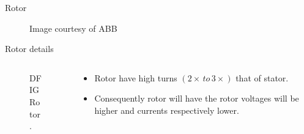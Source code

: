 \documentclass{beamer}
\begin{document}
\begin{frame}{Rotor}

    \begin{figure}
        \centering
        \caption{Image courtesy of ABB}
    \end{figure}    
\end{frame}


\begin{frame}{Rotor details}
  
  \begin{columns}
  
        \begin{column}{0.6\textwidth} %
    \begin{figure}
        \centering
        \caption{\small DFIG Rotor.}
    \end{figure}
    \end{column}
    
    \begin{column}{0.4\textwidth} 
        \begin{itemize}
            \item Rotor have high turns $(2\times\, to \,3\times)$ that of stator.

            \item Consequently rotor will have the rotor voltages will be higher and currents respectively lower. 
        \end{itemize}
    \end{column}

  \end{columns}
\end{frame}
\end{document}
